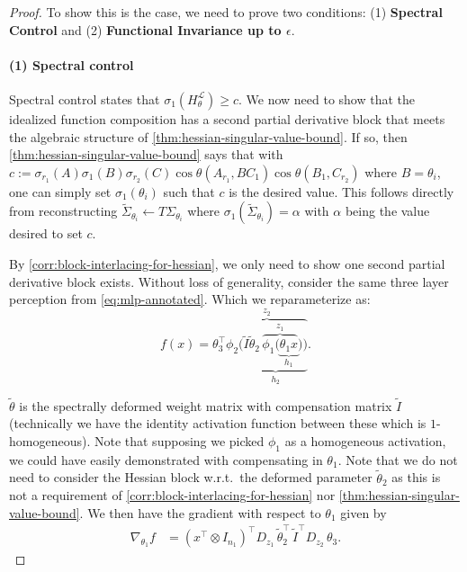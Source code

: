 \documentclass{article}
\newcommand{\prinangle}{\cos\theta}
\theoremstyle{plain}
\theoremstyle{definition}
\theoremstyle{remark}
\begin{document}
\begin{proof}
To show this is the case, we need to prove two conditions: (1) \textbf{Spectral Control} and (2) \textbf{Functional Invariance up to $\epsilon$}.

\paragraph{(1) Spectral control} Spectral control states that $\sigma_1(H_{\theta}^\mathcal{L}) \geq c$.
We now need to show that the idealized function composition has a second partial derivative block that meets the algebraic structure of \cref{thm:hessian-singular-value-bound}. If so, then \cref{thm:hessian-singular-value-bound} says that with $c := \sigma_{r_1}(A)\sigma_{1}(B)\sigma_{r_2}(C) \prinangle(A_{r_1},BC_1)\prinangle(B_1, C_{r_2})$ where $B = \theta_i$, one can simply set $\sigma_{1}(\theta_i)$ such that $c$ is the desired value.  This follows directly from reconstructing $\widetilde{\Sigma}_{\theta_i} \leftarrow T\Sigma_{\theta_i}$ where $\sigma_1(\widetilde{\Sigma}_{\theta_i}) = \alpha$ with $\alpha$ being the value desired to set $c$.

By \cref{corr:block-interlacing-for-hessian}, we only need to show one second partial derivative block exists. Without loss of generality, consider the same three layer perception from \cref{eq:mlp-annotated}. Which we reparameterize as: 
\begin{equation*}
f(x) = \theta_3^{\top} \overbrace{
\phi_2 (
\underbrace{\tilde{I}\tilde{\theta}_2\,  \overbrace{\phi_1(\underbrace{\theta_1x}_{h_1}}^{z_1}))}_{h_2}
}^\text{$z_2$}.
\end{equation*}

$\tilde{\theta}$ is the spectrally deformed weight matrix with compensation matrix $\tilde{I}$ (technically we have the identity activation function between these which is $1$-homogeneous). Note that supposing we picked $\phi_1$ as a homogeneous activation, we could have easily demonstrated with compensating in $\theta_1$. Note that we do not need to consider the Hessian block w.r.t.\ the deformed parameter $\tilde{\theta}_2$ as this is not a requirement of \cref{corr:block-interlacing-for-hessian} nor \cref{thm:hessian-singular-value-bound}.
We then have the gradient with respect to $\theta_1$ given by
\begin{align*}
\nabla_{\theta_1} f
&= (x^{\top} \otimes I_{n_1})^{\top}
D_{z_1}\,\tilde{\theta}_2^{\top}\,\tilde{I}^{\top} D_{z_2}\,\theta_3 .
\end{align*}


\end{proof}
\end{document}
